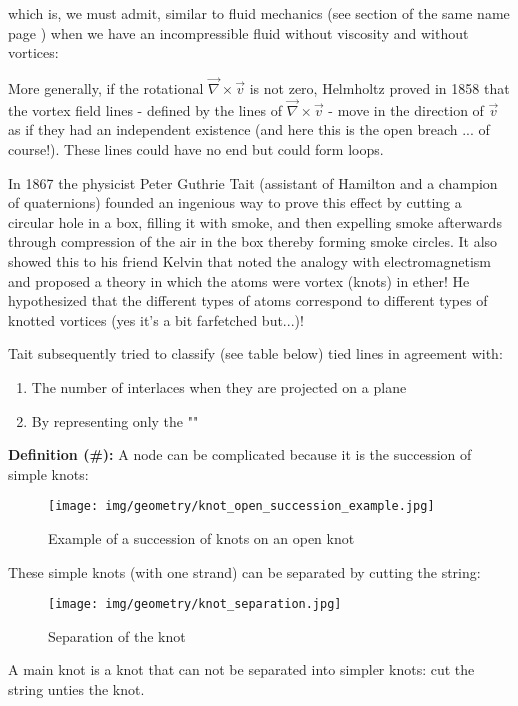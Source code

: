 {	which is, we must admit, similar to fluid mechanics (see section of the same name page \pageref{fluid mechanics}) when we have an incompressible fluid without viscosity and without vortices:
	
	More generally, if the rotational $\vec{ \nabla}\times \vec{v}$ is not zero, Helmholtz proved in 1858 that the vortex field lines - defined by the lines of $\vec{ \nabla}\times \vec{v}$ - move in the direction of $\vec{v}$ as if they had an independent existence (and here this is the open breach ... of course!). These lines could have no end but could form loops.
	
	In 1867 the physicist Peter Guthrie Tait (assistant of Hamilton and a champion of quaternions) founded an ingenious way to prove this effect by cutting a circular hole in a box, filling it with smoke, and then expelling smoke afterwards through compression of the air in the box thereby forming smoke circles. It also showed this to his friend Kelvin that noted the analogy with electromagnetism and proposed a theory in which the atoms were vortex (knots) in ether! He hypothesized that the different types of atoms correspond to different types of knotted vortices (yes it's a bit farfetched but...)!
	
	Tait subsequently tried to classify (see table below) tied lines in agreement with:
	\begin{enumerate}
		\item The number of interlaces when they are projected on a plane
		
		\item By representing only the ""
	\end{enumerate}
	\textbf{Definition (\#\mydef):} A node can be complicated because it is the succession of simple knots:
	\begin{figure}[H]
		\centering
		\texttt{[image: img/geometry/knot\_open\_succession\_example.jpg]}
		\caption{Example of a succession of knots on an open knot}
	\end{figure}
	These simple knots (with one strand) can be separated by cutting the string:
	\begin{figure}[H]
		\centering
		\texttt{[image: img/geometry/knot\_separation.jpg]}
		\caption{Separation of the knot}
	\end{figure}
	A main knot is a knot that can not be separated into simpler knots: cut the string unties the knot.
	
}
